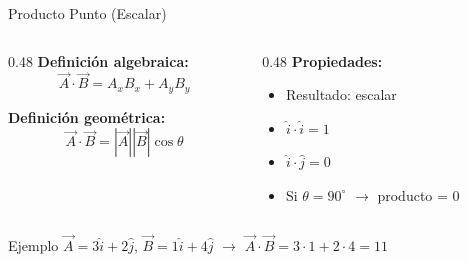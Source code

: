 \documentclass[aspectratio=169,xcolor=dvipsnames]{beamer}
\begin{document}
\begin{frame}{Producto Punto (Escalar)}
	\begin{columns}[T]
		\begin{column}{0.48\textwidth}
			\textbf{Definición algebraica:}
			\[
			\vec{A}\cdot\vec{B} = A_xB_x + A_yB_y
			\]
			
			\vspace{0.3cm}
			\textbf{Definición geométrica:}
			\[
			\vec{A}\cdot\vec{B} = |\vec{A}||\vec{B}|\cos\theta
			\]
		\end{column}
		\begin{column}{0.48\textwidth}
			\textbf{Propiedades:}
			\begin{itemize}
				\item Resultado: \alert{escalar}
				\item $\hat{i}\cdot\hat{i} = 1$
				\item $\hat{i}\cdot\hat{j} = 0$
				\item Si $\theta=90^\circ$ $\rightarrow$ producto = 0
			\end{itemize}
		\end{column}
	\end{columns}
	
	\vspace{0.2cm}
	\begin{exampleblock}{Ejemplo}
		$\vec{A}=3\hat{i}+2\hat{j}$, $\vec{B}=1\hat{i}+4\hat{j}$ $\rightarrow$ $\vec{A}\cdot\vec{B}=3\cdot1+2\cdot4=11$
	\end{exampleblock}
\end{frame}
\end{document}
